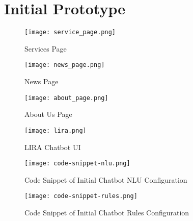 %
%
%                 

\chapter{Initial Prototype}
\label{sec:appendixa}

\begin{figure}[h]
	\centering 
	\texttt{[image: service\_page.png]}
	\caption{Services Page}
	\label{fig:service_page}
\end{figure}

\begin{figure}[h]
	\centering 
	\texttt{[image: news\_page.png]}
	\caption{News Page}
	\label{fig:news_page}
\end{figure}

\begin{figure}[h]
	\centering 
	\texttt{[image: about\_page.png]}
	\caption{About Us Page}
	\label{fig:anout_page}
\end{figure}

\newpage

\begin{figure}[h]
	\centering 
	\texttt{[image: lira.png]}
	\caption{LIRA Chatbot UI}
	\label{fig:LIRA}
\end{figure}

\newpage

\begin{figure}[h]
	\centering 
	\texttt{[image: code-snippet-nlu.png]}
	\caption{Code Snippet of Initial Chatbot NLU Configuration}
\end{figure}

\begin{figure}[h]
	\centering 
	\texttt{[image: code-snippet-rules.png]}
	\caption{Code Snippet of Initial Chatbot Rules Configuration}
\end{figure}


%

